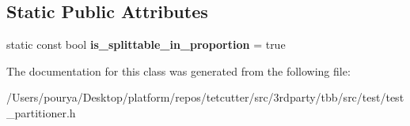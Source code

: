 \subsection*{Static Public Attributes}
\begin{DoxyCompactItemize}
\item 
\hypertarget{classtest__partitioner__utils_1_1interaction__with__range__and__partitioner_1_1Range4_addcc982e843ec5768f55bb1d28296f46}{}static const bool {\bfseries is\+\_\+splittable\+\_\+in\+\_\+proportion} = true\label{classtest__partitioner__utils_1_1interaction__with__range__and__partitioner_1_1Range4_addcc982e843ec5768f55bb1d28296f46}

\end{DoxyCompactItemize}


The documentation for this class was generated from the following file\+:\begin{DoxyCompactItemize}
\item 
/\+Users/pourya/\+Desktop/platform/repos/tetcutter/src/3rdparty/tbb/src/test/test\+\_\+partitioner.\+h\end{DoxyCompactItemize}
